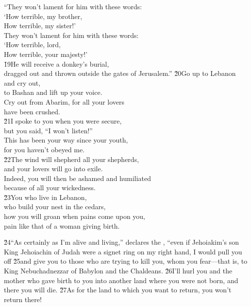 \begin{poetry}
\poeml ``They won't lament for him with these words: \\
\poemll    `How terrible, my brother, \\
\poemlll       How terrible, my sister!' \\
\poeml They won't lament for him with these words: \\
\poemll    `How terrible, lord, \\
\poemlll       How terrible, your majesty!' \\
\poeml \v{19}He will receive a donkey's burial, \\
\poemll    dragged out and thrown outside the gates of Jerusalem.''
\poeml \v{20}Go up to Lebanon and cry out, \\
\poemll    to Bashan and lift up your voice. \\
\poeml Cry out from Abarim, for all your lovers \\
\poemll    have been crushed. \\
\poeml \v{21}I spoke to you when you were secure, \\
\poemll    but you said, ``I won't listen!'' \\
\poeml This has been your way since your youth, \\
\poemll    for you haven't obeyed me. \\
\poeml \v{22}The wind will shepherd all your shepherds, \\
\poemll    and your lovers will go into exile. \\
\poeml Indeed, you will then be ashamed and humiliated \\
\poemll    because of all your wickedness. \\
\poeml \v{23}You who live in Lebanon, \\
\poemll    who build your nest in the cedars, \\
\poeml how you will groan when pains come upon you, \\
\poemll    pain like that of a woman giving birth.
\end{poetry}

\v{24}``As certainly as I'm alive and living,'' declares the , ``even if Jehoiakim's son King Jehoiachin of Judah were a signet ring on my right hand, I would pull you off \v{25}and give you to those who are trying to kill you, whom you fear---that is, to King Nebuchadnezzar of Babylon and the Chaldeans. \v{26}I'll hurl you and the mother who gave birth to you into another land where you were not born, and there you will die. \v{27}As for the land to which you want to return, you won't return there!

